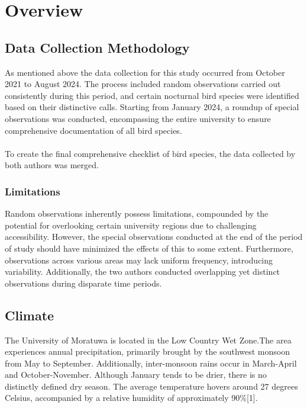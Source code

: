 \chapter{Overview}
\label{cp:overview}
\section{Data Collection Methodology}
As mentioned above the data collection for this study occurred from October 2021 to August 2024. The process included random observations carried out consistently during this period, and certain nocturnal bird species were identified based on their distinctive calls. Starting from January 2024, a roundup of special observations was conducted, encompassing the entire university to ensure comprehensive documentation of all bird species.
\\\\
To create the final comprehensive checklist of bird species, the data collected by both authors was merged.

\begin{importantbox}
\subsection{Limitations}
 Random observations inherently possess limitations, compounded by the potential for overlooking certain university regions due to challenging accessibility. However, the special observations conducted at the end of the period of study should have minimized the effects of this to some extent. Furthermore, observations across various areas may lack uniform frequency, introducing variability. Additionally, the two authors conducted overlapping yet distinct observations during disparate time periods.
\end{importantbox}

\section{Climate}
The University of Moratuwa is located in the Low Country Wet Zone.The area experiences annual precipitation, primarily brought by the southwest monsoon from May to September. Additionally, inter-monsoon rains occur in March-April and October-November. Although January tends to be drier, there is no distinctly defined dry season. The average temperature hovers around 27 degrees Celsius, accompanied by a relative humidity of approximately 90\%[1].

